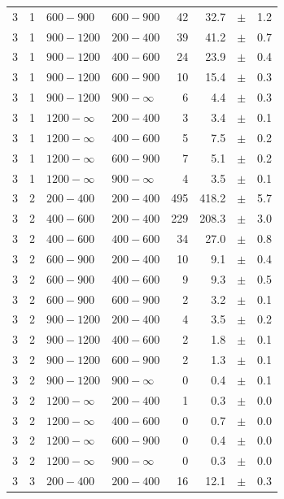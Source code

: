\begin{table}[!h]
\begin{tabular}{rrllrrcl}
3 & 1 & $ 600- 900$ & $600-900$ &     42 &     32.7 &$\pm$&    1.2 \\
3 & 1 & $ 900-1200$ & $200-400$ &     39 &     41.2 &$\pm$&    0.7 \\
3 & 1 & $ 900-1200$ & $400-600$ &     24 &     23.9 &$\pm$&    0.4 \\
3 & 1 & $ 900-1200$ & $600-900$ &     10 &     15.4 &$\pm$&    0.3 \\
3 & 1 & $ 900-1200$ & $900-\infty$ &      6 &      4.4 &$\pm$&    0.3 \\
3 & 1 & $1200- \infty$ & $200-400$ &      3 &      3.4 &$\pm$&    0.1 \\
3 & 1 & $1200- \infty$ & $400-600$ &      5 &      7.5 &$\pm$&    0.2 \\
3 & 1 & $1200- \infty$ & $600-900$ &      7 &      5.1 &$\pm$&    0.2 \\
3 & 1 & $1200- \infty$ & $900-\infty$ &      4 &      3.5 &$\pm$&    0.1 \\
3 & 2 & $ 200- 400$ & $200-400$ &    495 &    418.2 &$\pm$&    5.7 \\
3 & 2 & $ 400- 600$ & $200-400$ &    229 &    208.3 &$\pm$&    3.0 \\
3 & 2 & $ 400- 600$ & $400-600$ &     34 &     27.0 &$\pm$&    0.8 \\
3 & 2 & $ 600- 900$ & $200-400$ &     10 &      9.1 &$\pm$&    0.4 \\
3 & 2 & $ 600- 900$ & $400-600$ &      9 &      9.3 &$\pm$&    0.5 \\
3 & 2 & $ 600- 900$ & $600-900$ &      2 &      3.2 &$\pm$&    0.1 \\
3 & 2 & $ 900-1200$ & $200-400$ &      4 &      3.5 &$\pm$&    0.2 \\
3 & 2 & $ 900-1200$ & $400-600$ &      2 &      1.8 &$\pm$&    0.1 \\
3 & 2 & $ 900-1200$ & $600-900$ &      2 &      1.3 &$\pm$&    0.1 \\
3 & 2 & $ 900-1200$ & $900-\infty$ &      0 &      0.4 &$\pm$&    0.1 \\
3 & 2 & $1200- \infty$ & $200-400$ &      1 &      0.3 &$\pm$&    0.0 \\
3 & 2 & $1200- \infty$ & $400-600$ &      0 &      0.7 &$\pm$&    0.0 \\
3 & 2 & $1200- \infty$ & $600-900$ &      0 &      0.4 &$\pm$&    0.0 \\
3 & 2 & $1200- \infty$ & $900-\infty$ &      0 &      0.3 &$\pm$&    0.0 \\
3 & 3 & $ 200- 400$ & $200-400$ &     16 &     12.1 &$\pm$&    0.3 \\

\end{tabular}
\end{table}

